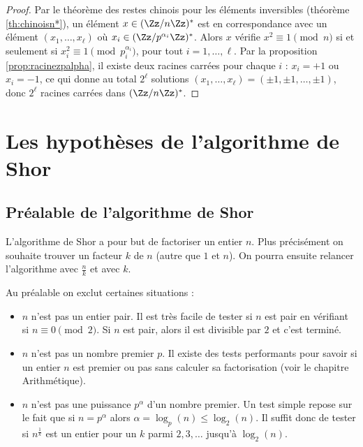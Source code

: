 \documentclass[11pt,class=report,crop=false]{standalone}
\begin{document}
\begin{proof}
Par le théorème des restes chinois pour les éléments inversibles (théorème \ref{th:chinoisn*}), un élément $x \in (\Zz/n\Zz)^*$
est en correspondance avec un élément $(x_1,\ldots,x_\ell)$ où $x_i \in (\Zz/p^{\alpha_i}\Zz)^*$. Alors $x$ vérifie $x^2 \equiv 1 \pmod{n}$ si et seulement si $x_i^2 \equiv 1 \pmod{p_i^{\alpha_i}}$, pour tout $i=1,\ldots,\ell$.
Par la proposition \ref{prop:racinezpalpha}, il existe deux racines carrées pour chaque $i$ : $x_i=+1$ ou $x_i=-1$, ce qui donne au total $2^\ell$ solutions 
$(x_1,\ldots,x_\ell) = (\pm1,\pm1,\ldots,\pm1)$, donc $2^\ell$ racines carrées dans $(\Zz/n\Zz)^*$.
\end{proof}



\section{Les hypothèses de l'algorithme de Shor}


\subsection{Préalable de l'algorithme de Shor}

L'algorithme de Shor a pour but de factoriser un entier $n$. Plus précisément on souhaite trouver un facteur $k$ de $n$ (autre que $1$ et $n$). On pourra ensuite relancer l'algorithme avec $\frac n k$ et avec $k$.

Au préalable on exclut certaines situations :
\begin{itemize}
  \item $n$ n'est pas un entier pair. Il est très facile  de tester si $n$ est pair en vérifiant si $n\equiv 0 \pmod{2}$. Si $n$ est pair, alors il est divisible par $2$ et c'est terminé.

  \item $n$ n'est pas un nombre premier $p$. Il existe des tests performants pour savoir si un entier $n$ est premier ou pas sans calculer sa factorisation (voir le chapitre \og{}Arithmétique\fg{}).

  \item $n$ n'est pas une puissance $p^\alpha$ d'un nombre premier. 
  Un test simple repose sur le fait que si $n=p^\alpha$ alors $\alpha = \log_p(n) \le \log_2(n)$. Il suffit donc de tester si $n^{\frac1k}$ est un entier pour un $k$ parmi $2,3,\ldots$ jusqu'à $\log_2(n)$.
\end{itemize}
\end{document}
